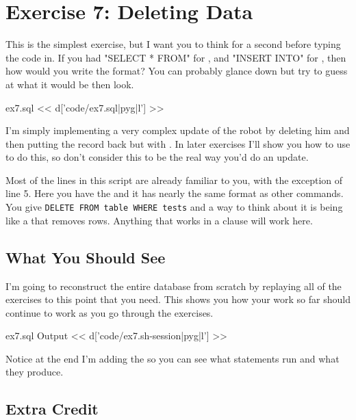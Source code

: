 \chapter{Exercise 7: Deleting Data}

This is the simplest exercise, but I want you to think for a second before
typing the code in.  If you had "SELECT * FROM" for , and
"INSERT INTO" for , then how would you write the 
format?  You can probably glance down but try to guess at what it would
be then look.

\begin{code}{ex7.sql}
<< d['code/ex7.sql|pyg|l'] >>
\end{code}

I'm simply implementing a very complex update of the robot by deleting 
him and then putting the record back but with .  In later
exercises I'll show you how to use  to do this, so don't
consider this to be the real way you'd do an update.

Most of the lines in this script are already familiar to you, with the
exception of line 5.  Here you have the  and it has
nearly the same format as other commands.  You give \verb|DELETE FROM table WHERE tests| and a way to think about it is being like a  that
removes rows.  Anything that works in a  clause will work here.

\section{What You Should See}

I'm going to reconstruct the entire database from scratch by replaying all of
the exercises to this point that you need.  This shows you how your work 
so far should continue to work as you go through the exercises.

\begin{code}{ex7.sql Output}
<< d['code/ex7.sh-session|pyg|l'] >>
\end{code}

Notice at the end I'm adding the  so you can see
what statements run and what they produce.

\section{Extra Credit}

